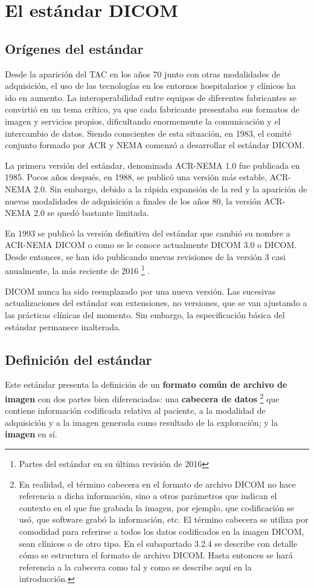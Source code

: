 \section{El estándar \acs{DICOM}}
\subsection{Orígenes del estándar}
Desde la aparición del TAC en los años 70 junto con otras modalidades de adquisición, el uso de las tecnologías en los entornos hospitalarios y clínicos ha ido en aumento. La interoperabilidad entre equipos de diferentes fabricantes se convirtió en un tema crítico, ya que cada fabricante presentaba sus formatos de imagen y servicios propios, dificultando enormemente la comunicación y el intercambio de datos. Siendo conscientes de esta situación, en 1983, el comité conjunto formado por ACR y NEMA comenzó a desarrollar el estándar \acs{DICOM}.

La primera versión del estándar, denominada ACR-NEMA 1.0 fue publicada en 1985. Pocos años después, en 1988, se publicó una versión más estable, ACR-NEMA 2.0. Sin embargo, debido a la rápida expansión de la red y la aparición de nuevas modalidades de adquisición a finales de los años 80, la versión ACR-NEMA 2.0 se quedó bastante limitada.

En 1993 se publicó la versión definitiva del estándar que cambió su nombre a ACR-NEMA \acs{DICOM} o como se le conoce actualmente \acs{DICOM} 3.0 o \acs{DICOM}. Desde entonces, se han ido publicando nuevas revisiones de la versión 3 casi anualmente, la más reciente de 2016 \footnote{Partes del estándar en su última revisión de 2016} \cite{1}.

\acs{DICOM} nunca ha sido reemplazado por una nueva versión. Las sucesivas actualizaciones del estándar son extensiones, no versiones, que se van ajustando a las prácticas clínicas del momento. Sin embargo, la especificación básica del estándar permanece inalterada. 

\subsection{Definición del estándar}
Este estándar presenta la definición de un \textbf{formato común de archivo de imagen} con dos partes bien diferenciadas: una \textbf{cabecera de datos} \footnote{En realidad, el término cabecera en el formato de archivo \acs{DICOM} no hace referencia a dicha información, sino a otros parámetros que indican el contexto en el que fue grabada la imagen, por ejemplo, que codificación se usó, que software grabó la información, etc. El término cabecera se utiliza por comodidad para referirse a todos los datos codificados en la imagen \acs{DICOM}, sean clínicos o de otro tipo. En el subapartado 3.2.4 se describe con detalle cómo se estructura el formato de archivo \acs{DICOM}. Hasta entonces se hará referencia a la cabecera como tal y como se describe aquí en la introducción.} que contiene información codificada relativa al paciente, a la modalidad de adquisición y a la imagen generada como resultado de la exploración; y la \textbf{imagen} en sí.

